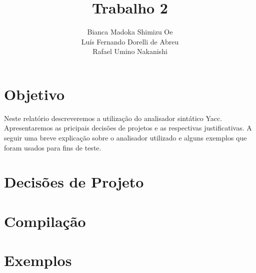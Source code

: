 \documentclass {article}
\title {Trabalho 2}
\author {Bianca Madoka Shimizu Oe \\ 
		Luís Fernando Dorelli de Abreu \\  
		Rafael Umino Nakanishi}
\begin{document}
\titlepage
\maketitle

\section{Objetivo}
	Neste relatório descreveremos a utilização do analisador sintático Yacc. Apresentaremos as pricipais decisões de projetos e as respectivas justificativas. A seguir uma breve explicação sobre o analisador utilizado e alguns exemplos que foram usados para fins de teste.

\section{Decisões de Projeto}

\section{Compilação}
	
\section{Exemplos}
\end{document}
